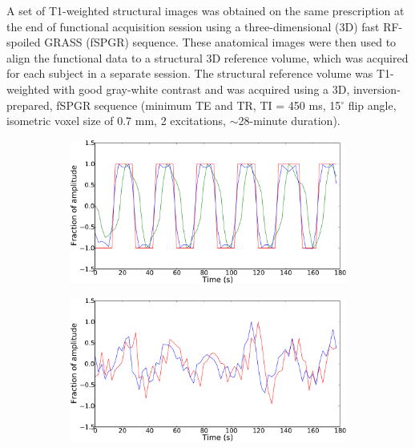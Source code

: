 \documentclass[preprint,5p,authoryear]{elsarticle}
\begin{document}
A set of T1-weighted structural images was obtained on the same prescription at the end of functional acquisition session using a three-dimensional (3D) fast RF-spoiled GRASS (fSPGR) sequence. 
These anatomical images were then used to align the functional data to a structural 3D reference volume, which was acquired for each subject in a separate session. 
The structural reference volume was T1-weighted with good gray-white contrast and was acquired using a 3D, inversion-prepared, fSPGR sequence (minimum TE and TR, TI = 450 ms, 15$^\circ$ flip angle, isometric voxel size of 0.7 mm, 2 excitations, $\sim$28-minute duration).

\begin{figure}
\centering
\begin{subfigure}{0.4\textwidth}
\centering
\includegraphics[width=\textwidth]{figures/square-wiener-deconvolution}
\caption{}
\label{fig:wiener-square}
\end{subfigure}
\begin{subfigure}{0.4\textwidth}
\centering
\includegraphics[width=\textwidth]{figures/voxel-wiener-deconvolution}

\end{subfigure}
\end{figure}
\end{document}
